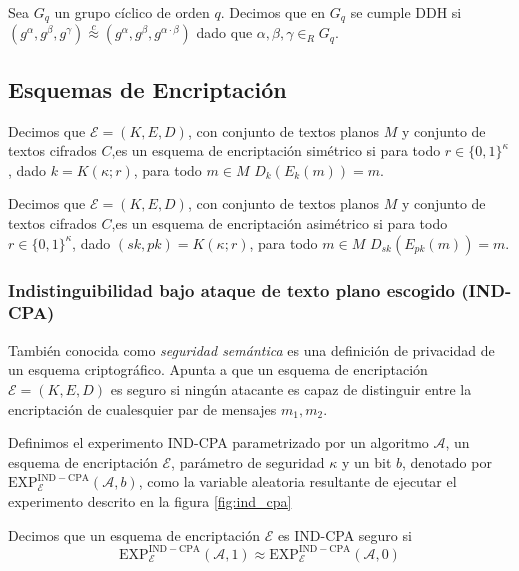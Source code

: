\begin{definicion}[DDH]
Sea $G_q$ un grupo cíclico de orden $q$. Decimos que en $G_q$ se cumple DDH
si $(g^\alpha, g^\beta, g^\gamma) \overset{c}{\approx}
(g^\alpha, g^\beta, g^{\alpha \cdot \beta})$ dado que $\alpha, \beta, \gamma \in_R G_q$.
\end{definicion}

\subsection{Esquemas de Encriptación}
Decimos que $\mathcal{E} = (K, E, D)$, con conjunto de textos planos $M$ y conjunto de textos
cifrados $C$,es un esquema de encriptación simétrico si para todo
$r \in \{0, 1\}^\kappa$, dado $k = K(\kappa; r)$, para todo $m\in M$ $D_k(E_k(m))=m$.

Decimos que $\mathcal{E} = (K, E, D)$, con conjunto de textos planos $M$ y conjunto de textos
cifrados $C$,es un esquema de encriptación asimétrico si para todo
$r \in \{0, 1\}^\kappa$, dado $(sk, pk) = K(\kappa; r)$, para todo $m\in M$ $D_{sk}(E_{pk}(m))=m$.


\subsubsection{Indistinguibilidad bajo ataque de texto plano escogido (IND-CPA)}
También conocida como \textit{seguridad semántica} es una definición de privacidad de un esquema
criptográfico. Apunta a que un esquema de encriptación $\mathcal{E} = (K, E, D)$ es seguro si ningún atacante es capaz de
distinguir entre la encriptación de cualesquier par de mensajes $m_1, m_2$.


\begin{definicion}
Definimos el experimento IND-CPA parametrizado por un algoritmo $\mathcal{A}$,
un esquema de encriptación $\mathcal{E}$, parámetro de seguridad $\kappa$ y
un bit $b$, denotado por $\mathrm{EXP}^\mathrm{IND-CPA}_\mathcal{E}(\mathcal{A}, b)$,
como la variable aleatoria resultante de
ejecutar el experimento descrito en la figura \ref{fig:ind_cpa}
\end{definicion}


\begin{definicion}
Decimos que un esquema de encriptación $\mathcal{E}$ es IND-CPA seguro si
$$\mathrm{EXP}^\mathrm{IND-CPA}_\mathcal{E}(\mathcal{A}, 1) \approx
\mathrm{EXP}^\mathrm{IND-CPA}_\mathcal{E}(\mathcal{A}, 0)$$
\end{definicion}

